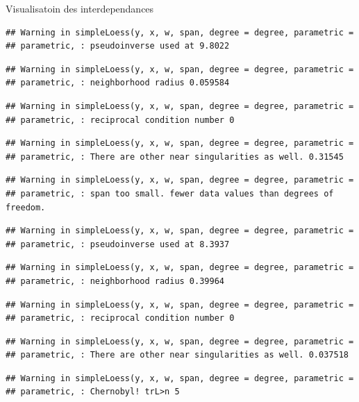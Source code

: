\documentclass[11pt,ignorenonframetext,]{beamer}
\begin{document}
\begin{frame}[fragile]{Visualisatoin des interdependances}
\begin{verbatim}
## Warning in simpleLoess(y, x, w, span, degree = degree, parametric =
## parametric, : pseudoinverse used at 9.8022
\end{verbatim}

\begin{verbatim}
## Warning in simpleLoess(y, x, w, span, degree = degree, parametric =
## parametric, : neighborhood radius 0.059584
\end{verbatim}

\begin{verbatim}
## Warning in simpleLoess(y, x, w, span, degree = degree, parametric =
## parametric, : reciprocal condition number 0
\end{verbatim}

\begin{verbatim}
## Warning in simpleLoess(y, x, w, span, degree = degree, parametric =
## parametric, : There are other near singularities as well. 0.31545
\end{verbatim}

\begin{verbatim}
## Warning in simpleLoess(y, x, w, span, degree = degree, parametric =
## parametric, : span too small. fewer data values than degrees of freedom.
\end{verbatim}

\begin{verbatim}
## Warning in simpleLoess(y, x, w, span, degree = degree, parametric =
## parametric, : pseudoinverse used at 8.3937
\end{verbatim}

\begin{verbatim}
## Warning in simpleLoess(y, x, w, span, degree = degree, parametric =
## parametric, : neighborhood radius 0.39964
\end{verbatim}

\begin{verbatim}
## Warning in simpleLoess(y, x, w, span, degree = degree, parametric =
## parametric, : reciprocal condition number 0
\end{verbatim}

\begin{verbatim}
## Warning in simpleLoess(y, x, w, span, degree = degree, parametric =
## parametric, : There are other near singularities as well. 0.037518
\end{verbatim}

\begin{verbatim}
## Warning in simpleLoess(y, x, w, span, degree = degree, parametric =
## parametric, : Chernobyl! trL>n 5


\end{verbatim}
\end{frame}
\end{document}
